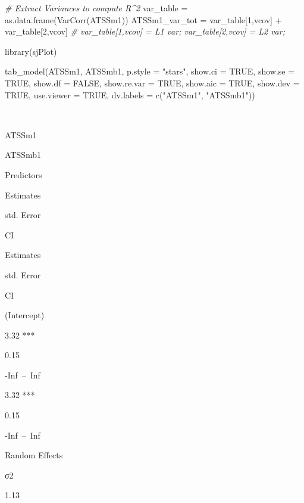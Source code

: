 \documentclass[
  11pt,
]{book}
\newenvironment{Shaded}{\begin{snugshade}}{\end{snugshade}}
\newcommand{\AttributeTok}[1]{\textcolor[rgb]{0.77,0.63,0.00}{#1}}
\newcommand{\CommentTok}[1]{\textcolor[rgb]{0.56,0.35,0.01}{\textit{#1}}}
\newcommand{\ConstantTok}[1]{\textcolor[rgb]{0.00,0.00,0.00}{#1}}
\newcommand{\DecValTok}[1]{\textcolor[rgb]{0.00,0.00,0.81}{#1}}
\newcommand{\FunctionTok}[1]{\textcolor[rgb]{0.00,0.00,0.00}{#1}}
\newcommand{\NormalTok}[1]{#1}
\newcommand{\OtherTok}[1]{\textcolor[rgb]{0.56,0.35,0.01}{#1}}
\newcommand{\SpecialCharTok}[1]{\textcolor[rgb]{0.00,0.00,0.00}{#1}}
\newcommand{\StringTok}[1]{\textcolor[rgb]{0.31,0.60,0.02}{#1}}
\begin{document}
\begin{Shaded}
\begin{Highlighting}[]
\CommentTok{\# Extract Variances to compute R\^{}2}
\NormalTok{  var\_table }\OtherTok{=} \FunctionTok{as.data.frame}\NormalTok{(}\FunctionTok{VarCorr}\NormalTok{(ATSSm1))}
\NormalTok{  ATSSm1\_var\_tot }\OtherTok{=}\NormalTok{ var\_table[}\DecValTok{1}\NormalTok{,}\StringTok{\textquotesingle{}vcov\textquotesingle{}}\NormalTok{] }\SpecialCharTok{+}\NormalTok{ var\_table[}\DecValTok{2}\NormalTok{,}\StringTok{\textquotesingle{}vcov\textquotesingle{}}\NormalTok{] }\CommentTok{\# var\_table[1,\textquotesingle{}vcov\textquotesingle{}] = L1 var; var\_table[2,\textquotesingle{}vcov\textquotesingle{}] = L2 var;  }

\FunctionTok{library}\NormalTok{(sjPlot)}

\FunctionTok{tab\_model}\NormalTok{(ATSSm1, ATSSmb1, }\AttributeTok{p.style =} \StringTok{"stars"}\NormalTok{, }\AttributeTok{show.ci =} \ConstantTok{TRUE}\NormalTok{, }\AttributeTok{show.se =} \ConstantTok{TRUE}\NormalTok{, }\AttributeTok{show.df =} \ConstantTok{FALSE}\NormalTok{, }\AttributeTok{show.re.var =} \ConstantTok{TRUE}\NormalTok{, }\AttributeTok{show.aic =} \ConstantTok{TRUE}\NormalTok{, }\AttributeTok{show.dev =} \ConstantTok{TRUE}\NormalTok{, }\AttributeTok{use.viewer =} \ConstantTok{TRUE}\NormalTok{, }\AttributeTok{dv.labels =} \FunctionTok{c}\NormalTok{(}\StringTok{"ATSSm1"}\NormalTok{, }\StringTok{"ATSSmb1"}\NormalTok{))}
\end{Highlighting}
\end{Shaded}

~

ATSSm1

ATSSmb1

Predictors

Estimates

std. Error

CI

Estimates

std. Error

CI

(Intercept)

3.32 ***

0.15

-Inf~--~Inf

3.32 ***

0.15

-Inf~--~Inf

Random Effects

σ2

1.13
\end{document}
